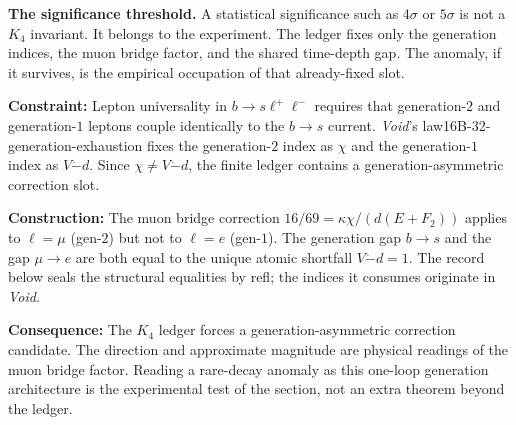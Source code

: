 \documentclass[11pt,a4paper]{book}
\def\texttt#1{#1}%
\begin{document}
\textbf{The significance threshold.} A statistical significance such as $4\sigma$ or $5\sigma$ is not a $K_4$ invariant. It belongs to the experiment. The ledger fixes only the generation indices, the muon bridge factor, and the shared time-depth gap. The anomaly, if it survives, is the empirical occupation of that already-fixed slot.

\medskip

\textbf{Constraint:} Lepton universality in $b \to s \ell^+\ell^-$ requires that generation-$2$ and generation-$1$ leptons couple identically to the $b \to s$ current. \textit{Void}'s \texttt{law16B-32-generation-exhaustion} fixes the generation-$2$ index as $\chi$ and the generation-$1$ index as $V \dot{-} d$. Since $\chi \neq V \dot{-} d$, the finite ledger contains a generation-asymmetric correction slot.

\textbf{Construction:} The muon bridge correction $16/69 = \kappa\chi / (d(E + F_2))$ applies to $\ell = \mu$ (gen-$2$) but not to $\ell = e$ (gen-$1$). The generation gap $b \to s$ and the gap $\mu \to e$ are both equal to the unique atomic shortfall $V \dot{-} d = 1$. The record below seals the structural equalities by \texttt{refl}; the indices it consumes originate in \textit{Void}.

\textbf{Consequence:} The $K_4$ ledger forces a generation-asymmetric correction candidate. The direction and approximate magnitude are physical readings of the muon bridge factor. Reading a rare-decay anomaly as this one-loop generation architecture is the experimental test of the section, not an extra theorem beyond the ledger.
\end{document}
